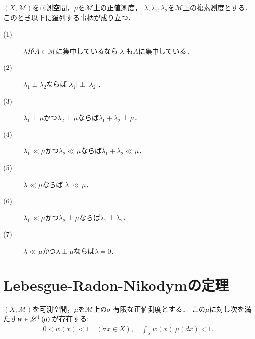 	\begin{itembox}[l]{}
		\begin{prp}[絶対連続性と特異性に関する性質]
			$(X,\mathcal{M})$を可測空間，$\mu$を$\mathcal{M}$上の正値測度，
			$\lambda,\lambda_1,\lambda_2$を$\mathcal{M}$上の複素測度とする．このとき以下に羅列する事柄が成り立つ．
			\begin{description}
				\item[(1)] $\lambda$が$A \in \mathcal{M}$に集中しているなら$|\lambda|$も$A$に集中している．
				\item[(2)] $\lambda_1 \perp \lambda_2$ならば$|\lambda_1| \perp |\lambda_2|$．
				\item[(3)] $\lambda_1 \perp \mu$かつ$\lambda_2 \perp \mu$ならば$\lambda_1 + \lambda_2 \perp \mu$．
				\item[(4)] $\lambda_1 \ll \mu$かつ$\lambda_2 \ll \mu$ならば$\lambda_1 + \lambda_2 \ll \mu$．
				\item[(5)] $\lambda \ll \mu$ならば$|\lambda| \ll \mu$．
				\item[(6)] $\lambda_1 \ll \mu$かつ$\lambda_2 \perp \mu$ならば$\lambda_1 \perp \lambda_2$．
				\item[(7)] $\lambda \ll \mu$かつ$\lambda \perp \mu$ならば$\lambda = 0$．
			\end{description}
			\label{prp:absolute_continuous_singular}
		\end{prp}
	\end{itembox}
	
\section{Lebesgue-Radon-Nikodymの定理}
	\begin{itembox}[l]{}
		\begin{lem}
			$(X,\mathcal{M})$を可測空間，$\mu$を$\mathcal{M}$上の$\sigma$-有限な正値測度とする．
			この$\mu$に対し次を満たす$w \in \mathscr{L}^{1} \left(\mu\right)$\footnotemark
			が存在する:
			\begin{align}
				0 < w(x) < 1 \quad (\forall x \in X), \quad \int_X w(x)\ \mu(dx) < 1.
			\end{align}
			\label{lem:lebesgue-radon-nikodym}
		\end{lem}
	\end{itembox}
	
	
